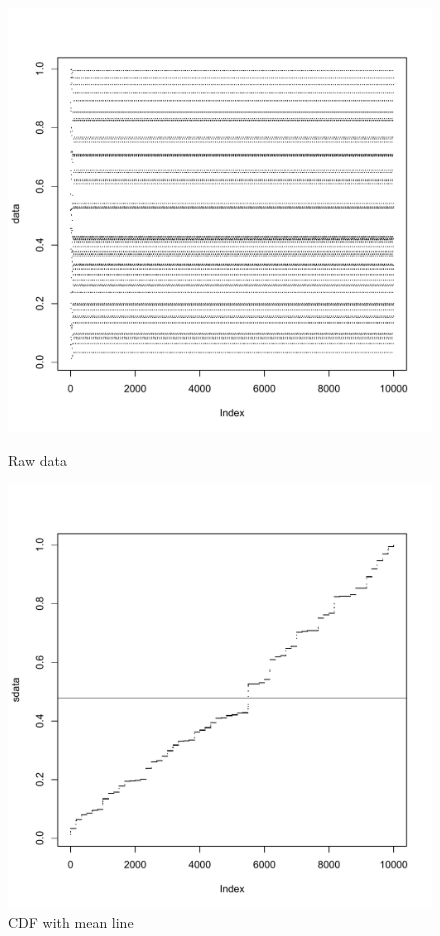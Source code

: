 \documentclass[11pt]{article}
\begin{document}
\begin{figure}[ht]
\begin{minipage}[b]{0.45\linewidth}
\centering
\includegraphics[scale=.42]{a4564raw.pdf}
\caption{Raw data}
\label{fig:figure1}
\end{minipage}
\begin{minipage}[b]{0.45\linewidth}
\centering
\includegraphics[scale=.42]{a4564cdf.pdf}
\caption{CDF with mean line}
\label{fig:figure2}
\end{minipage}


\end{figure}
\end{document}
